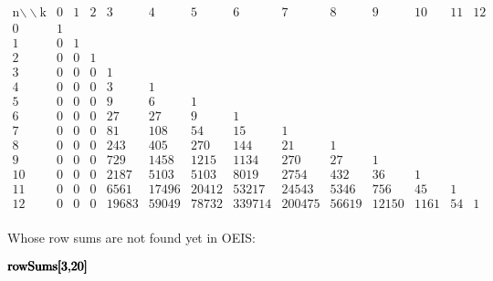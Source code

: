 \documentclass{article}
\begin{document}
\begin{doublespace}
\noindent\(\begin{array}{rrrrrrrrrrrrrr}
 \text{n$\backslash \backslash $k} & 0 & 1 & 2 & 3 & 4 & 5 & 6 & 7 & 8 & 9 & 10 & 11 & 12 \\
 0 & 1 & \text{} & \text{} & \text{} & \text{} & \text{} & \text{} & \text{} & \text{} & \text{} & \text{} & \text{} & \text{} \\
 1 & 0 & 1 & \text{} & \text{} & \text{} & \text{} & \text{} & \text{} & \text{} & \text{} & \text{} & \text{} & \text{} \\
 2 & 0 & 0 & 1 & \text{} & \text{} & \text{} & \text{} & \text{} & \text{} & \text{} & \text{} & \text{} & \text{} \\
 3 & 0 & 0 & 0 & 1 & \text{} & \text{} & \text{} & \text{} & \text{} & \text{} & \text{} & \text{} & \text{} \\
 4 & 0 & 0 & 0 & 3 & 1 & \text{} & \text{} & \text{} & \text{} & \text{} & \text{} & \text{} & \text{} \\
 5 & 0 & 0 & 0 & 9 & 6 & 1 & \text{} & \text{} & \text{} & \text{} & \text{} & \text{} & \text{} \\
 6 & 0 & 0 & 0 & 27 & 27 & 9 & 1 & \text{} & \text{} & \text{} & \text{} & \text{} & \text{} \\
 7 & 0 & 0 & 0 & 81 & 108 & 54 & 15 & 1 & \text{} & \text{} & \text{} & \text{} & \text{} \\
 8 & 0 & 0 & 0 & 243 & 405 & 270 & 144 & 21 & 1 & \text{} & \text{} & \text{} & \text{} \\
 9 & 0 & 0 & 0 & 729 & 1458 & 1215 & 1134 & 270 & 27 & 1 & \text{} & \text{} & \text{} \\
 10 & 0 & 0 & 0 & 2187 & 5103 & 5103 & 8019 & 2754 & 432 & 36 & 1 & \text{} & \text{} \\
 11 & 0 & 0 & 0 & 6561 & 17496 & 20412 & 53217 & 24543 & 5346 & 756 & 45 & 1 & \text{} \\
 12 & 0 & 0 & 0 & 19683 & 59049 & 78732 & 339714 & 200475 & 56619 & 12150 & 1161 & 54 & 1 \\
\end{array}\)
\end{doublespace}

Whose row sums are not found yet in OEIS:

\begin{doublespace}
\noindent\(\pmb{\text{rowSums}[3,}\\
\pmb{20]}\)
\end{doublespace}
\end{document}
